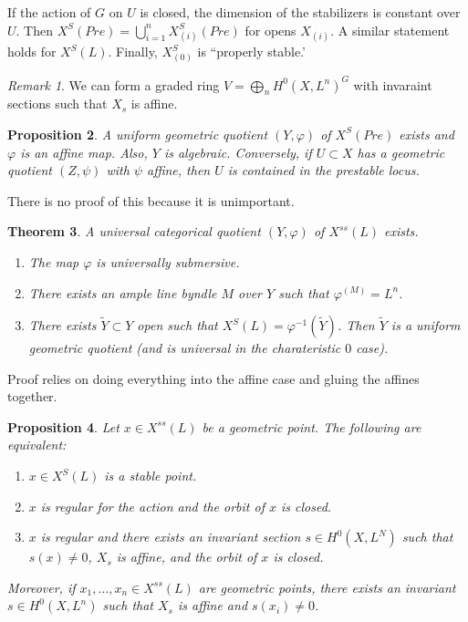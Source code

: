 \documentclass[leqno, openany]{memoir}
\newtheorem{thm}{Theorem}[section]
\newtheorem{prop}[thm]{Proposition}
\theoremstyle{definition}
\theoremstyle{remark}
\newtheorem{rmk}[thm]{Remark}
\theoremstyle{plain}
\theoremstyle{definition}
\theoremstyle{remark}
\newcommand{\wt}[1]{\widetilde{#1}}
\begin{document}
If the action of $G$ on $U$ is closed, the dimension of the stabilizers is constant over $U$. Then $X^S(Pre) = \bigcup_{i=1}^n X_{(i)}^S(Pre)$ for opens $X_{(i)}$. A similar statement holds for $X^S(L)$. Finally, $X_{(0)}^S$ is ``properly stable.'

\begin{rmk}
    We can form a graded ring $V = \bigoplus_n H^0(X, L^n)^G$ with invaraint sections such that $X_s$ is affine.
\end{rmk}

\begin{prop}
    A uniform geometric quotient $(Y, \varphi)$ of $X^S(Pre)$ exists and $\varphi$ is an affine map. Also, $Y$ is algebraic. Conversely, if $U \subset X$ has a geometric quotient $(Z, \psi)$ with $\psi$ affine, then $U$ is contained in the prestable locus.
\end{prop}

There is no proof of this because it is unimportant.

\begin{thm}
    A universal categorical quotient $(Y, \varphi)$ of $X^{ss}(L)$ exists.
    \begin{enumerate}
        \item The map $\varphi$ is universally submersive.
        \item There exists an ample line byndle $M$ over $Y$ such that $\varphi^(M) = L^n$.
        \item There exists $\wt{Y} \subset Y$ open such that $X^S(L) = \varphi^{-1}(\wt{Y})$. Then $\wt{Y}$ is a uniform geometric quotient (and is universal in the charateristic $0$ case).
    \end{enumerate}
\end{thm}

Proof relies on doing everything into the affine case and gluing the affines together. 

\begin{prop}
    Let $x \in X^{ss}(L)$ be a geometric point. The following are equivalent:
    \begin{enumerate}
        \item $x \in X^S(L)$ is a stable point.
        \item $x$ is regular for the action and the orbit of $x$ is closed.
        \item $x$ is regular and there exists an invariant section $s \in H^0(X,L^N)$ such that $s(x) \neq 0$, $X_s$ is affine, and the orbit of $x$ is closed.
    \end{enumerate}
    Moreover, if $x_1, \ldots, x_n \in X^{ss}(L)$ are geometric points, there exists an invariant $s \in H^0(X, L^n)$ such that $X_s$ is affine and $s(x_i) \neq 0$.
\end{prop}
\end{document}
